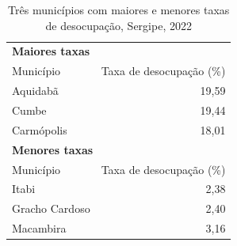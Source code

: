 \begin{table}[H]
\centering
\caption{Três municípios com maiores e menores taxas de desocupação, Sergipe, 2022}
\label{tab:item2-taxa-desocupacao}
\small
\begin{tabular}{l r}
\toprule
\multicolumn{2}{l}{\textbf{Maiores taxas}} \\
Município & Taxa de desocupação (\%) \\
\midrule
Aquidabã & 19,59 \\
Cumbe & 19,44 \\
Carmópolis & 18,01 \\
\midrule
\multicolumn{2}{l}{\textbf{Menores taxas}} \\
Município & Taxa de desocupação (\%) \\
\midrule
Itabi & 2,38 \\
Gracho Cardoso & 2,40 \\
Macambira & 3,16 \\
\bottomrule
\end{tabular}
\begingroup
{}
\par
\endgroup
\end{table}
